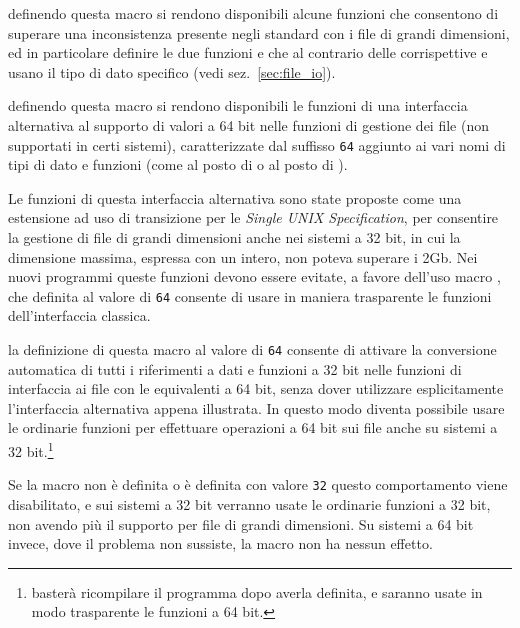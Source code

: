 \begin{basedescript}{\desclabelwidth{2.7cm}\desclabelstyle{\nextlinelabel}}

\item[\macrod{\_LARGEFILE\_SOURCE}] definendo questa macro si rendono
  disponibili alcune funzioni che consentono di superare una inconsistenza
  presente negli standard con i file di grandi dimensioni, ed in particolare
  definire le due funzioni  e  che al contrario
  delle corrispettive  e  usano il tipo di dato
  specifico  (vedi sez.~\ref{sec:file_io}).

\item[\macrod{\_LARGEFILE64\_SOURCE}] definendo questa macro si rendono
  disponibili le funzioni di una interfaccia alternativa al supporto di valori
  a 64 bit nelle funzioni di gestione dei file (non supportati in certi
  sistemi), caratterizzate dal suffisso \texttt{64} aggiunto ai vari nomi di
  tipi di dato e funzioni (come  al posto di  o
   al posto di ).

  Le funzioni di questa interfaccia alternativa sono state proposte come una
  estensione ad uso di transizione per le \textit{Single UNIX Specification},
  per consentire la gestione di file di grandi dimensioni anche nei sistemi a
  32 bit, in cui la dimensione massima, espressa con un intero, non poteva
  superare i 2Gb.  Nei nuovi programmi queste funzioni devono essere evitate,
  a favore dell'uso macro , che definita al valore
  di \texttt{64} consente di usare in maniera trasparente le funzioni
  dell'interfaccia classica.

\item[\macrod{\_FILE\_OFFSET\_BITS}] la definizione di questa macro al valore
  di \texttt{64} consente di attivare la conversione automatica di tutti i
  riferimenti a dati e funzioni a 32 bit nelle funzioni di interfaccia ai file
  con le equivalenti a 64 bit, senza dover utilizzare esplicitamente
  l'interfaccia alternativa appena illustrata. In questo modo diventa
  possibile usare le ordinarie funzioni per effettuare operazioni a 64 bit sui
  file anche su sistemi a 32 bit.\footnote{basterà ricompilare il programma
    dopo averla definita, e saranno usate in modo trasparente le funzioni a 64
    bit.}

  Se la macro non è definita o è definita con valore \texttt{32} questo
  comportamento viene disabilitato, e sui sistemi a 32 bit verranno usate le
  ordinarie funzioni a 32 bit, non avendo più il supporto per file di grandi
  dimensioni. Su sistemi a 64 bit invece, dove il problema non sussiste, la
  macro non ha nessun effetto.


\end{basedescript}
